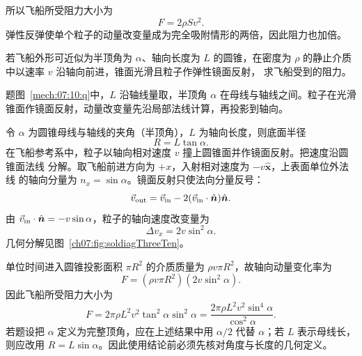 {\begin{xesolution}
\soldiagThreeNine
所以飞船所受阻力大小为
\[
 \boxed{F=2\rho Sv^2}.
\]
弹性反弹使单个粒子的动量改变量成为完全吸附情形的两倍，因此阻力也加倍。
\end{xesolution}

\begin{origexamplebox}{}\label{ch07:ex:s07-3-10}
若飞船外形可近似为半顶角为 $\alpha$、轴向长度为 $L$ 的圆锥，在密度为 $\rho$ 的静止介质中以速率 $v$ 沿轴向前进，锥面光滑且粒子作弹性镜面反射，
求飞船受到的阻力。

\begin{qualityfigure}
\label{mech:07:10:q}
\end{qualityfigure}
\end{origexamplebox}

\begin{xesolution}题图~\ref{mech:07:10:q}中，$L$ 沿轴线量取，半顶角 $\alpha$ 在母线与轴线之间。粒子在光滑锥面作镜面反射，动量改变量先沿局部法线计算，再投影到轴向。

令 $\alpha$ 为圆锥母线与轴线的夹角（半顶角），$L$ 为轴向长度，则底面半径
\[
 R=L\tan\alpha.
\]
在飞船参考系中，粒子以轴向相对速度 $v$ 撞上圆锥面并作镜面反射。把速度沿圆锥面法线
分解。取飞船前进方向为 $+x$，入射相对速度为 $-v\hat{\boldsymbol x}$，上表面单位外法线
的轴向分量为 $n_x=\sin\alpha$。镜面反射只使法向分量反号：
\[
 \vec v_{\rm out}=\vec v_{\rm in}
 -2(\vec v_{\rm in}\cdot\hat{\boldsymbol n})\hat{\boldsymbol n}.
\]
由 $\vec v_{\rm in}\cdot\hat{\boldsymbol n}=-v\sin\alpha$，粒子的轴向速度改变量为
\[
 \Delta v_x=2v\sin^2\alpha.
\]
几何分解见图~\ref{ch07:fig:soldiagThreeTen}。

\soldiagThreeTen
单位时间进入圆锥投影面积 $\pi R^2$ 的介质质量为 $\rho v\pi R^2$，故轴向动量变化率为
\[
 F=(\rho v\pi R^2)(2v\sin^2\alpha).
\]
因此飞船所受阻力大小为
\[
 \boxed{F=2\pi\rho L^2v^2\tan^2\alpha\sin^2\alpha
 =\frac{2\pi\rho L^2v^2\sin^4\alpha}{\cos^2\alpha}}.
\]
若题设把 $\alpha$ 定义为完整顶角，应在上述结果中用 $\alpha/2$ 代替 $\alpha$；若 $L$
表示母线长，则应改用 $R=L\sin\alpha$。因此使用结论前必须先核对角度与长度的几何定义。
\end{xesolution}

}
